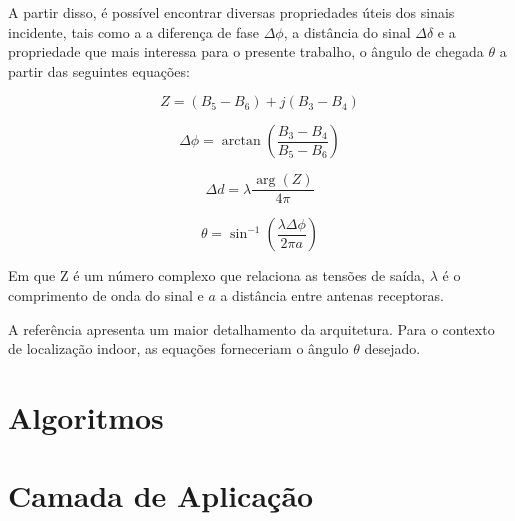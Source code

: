 A partir disso, é possível encontrar diversas propriedades úteis dos sinais incidente, tais como a a diferença de fase \( \Delta\phi\), a distância do sinal \( \Delta\delta\) e a propriedade que mais interessa para o presente trabalho, o ângulo de chegada \(\theta\) a partir das seguintes equações:

\begin{equation}
    Z = (B_5 - B_6) + j(B_3 - B_4)
\end{equation}

\begin{equation}
    \Delta \phi = \arctan \left ( \frac{B_3-B_4}{B_5-B_6} \right )
\end{equation}

\begin{equation}
    \Delta d = \lambda \frac{\arg\left ({Z}  \right ) }{4\pi }
\end{equation}

\begin{equation} \label{eq:eq_AoA}
    \theta = \sin^{-1}{(\frac{\lambda \Delta \phi}{2\pi a} )}
\end{equation}

Em que Z é um número complexo que relaciona as tensões de saída, \(\lambda\) é o comprimento de onda do sinal e \(a\) a distância entre antenas receptoras.

A referência \cite{art15} apresenta um maior detalhamento da arquitetura. Para o contexto de localização indoor, as equações forneceriam o ângulo \(\theta\) desejado.

\section{Algoritmos}


\section{Camada de Aplicação}





   
   

